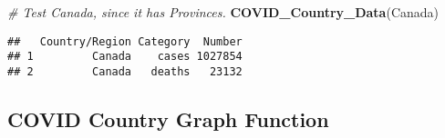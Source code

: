 \documentclass[]{tufte-handout}
\newenvironment{Shaded}{}{}
\newcommand{\CommentTok}[1]{\textcolor[rgb]{0.38,0.63,0.69}{\textit{#1}}}
\newcommand{\KeywordTok}[1]{\textcolor[rgb]{0.00,0.44,0.13}{\textbf{#1}}}
\newcommand{\NormalTok}[1]{#1}
\begin{document}
\begin{Shaded}
\begin{Highlighting}[]
\CommentTok{# Test Canada, since it has Provinces.}
\KeywordTok{COVID_Country_Data}\NormalTok{(Canada)}
\end{Highlighting}
\end{Shaded}

\begin{verbatim}
##   Country/Region Category  Number
## 1         Canada    cases 1027854
## 2         Canada   deaths   23132
\end{verbatim}

\hypertarget{covid-country-graph-function}{%
\subsection{COVID Country Graph
Function}\label{covid-country-graph-function}}
\end{document}
